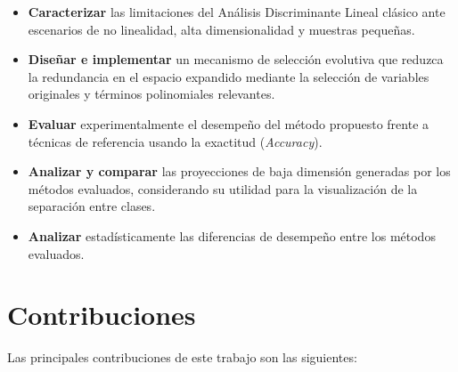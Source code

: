 \begin{itemize}
	\item \textbf{Caracterizar} las limitaciones del Análisis Discriminante Lineal clásico ante
	escenarios de no linealidad, alta dimensionalidad y muestras pequeñas.
	
	\item \textbf{Diseñar e implementar} un mecanismo de selección evolutiva que reduzca la
	redundancia en el espacio expandido mediante la selección de variables originales y términos
	polinomiales relevantes.
	
	\item \textbf{Evaluar} experimentalmente el desempeño del método propuesto frente a técnicas de
	referencia usando la exactitud (\textit{Accuracy}).
	
	\item \textbf{Analizar y comparar} las proyecciones de baja dimensión generadas por los métodos
	evaluados, considerando su utilidad para la visualización de la separación entre clases.
	
	\item \textbf{Analizar} estadísticamente las diferencias de desempeño entre los métodos evaluados.
	
\end{itemize}

\section{Contribuciones}
\label{sec:Contribuciones}

Las principales contribuciones de este trabajo son las siguientes:

